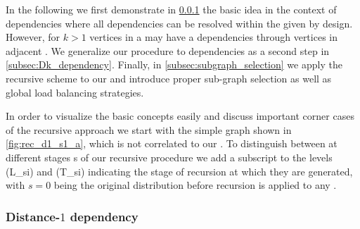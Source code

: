 In the following we first demonstrate in \cref{subsec:D1_dependency} the basic idea in the context of \DONE dependencies where all dependencies can be resolved within the given \levelGroup by design. However, for $k>1$ vertices in a \levelGroup may have a \DK dependencies through vertices in adjacent \levelGroups. We generalize our procedure to \DK dependencies as a second step in \cref{subsec:Dk_dependency}. Finally, in \cref{subsec:subgraph_selection} we apply the recursive scheme to our \stex and introduce proper sub-graph selection as well as global load balancing strategies. 

In order to visualize the basic concepts easily and discuss important corner cases of the recursive approach we start with the simple graph shown in \cref{fig:rec_d1_s1_a}, which is not correlated to our \stex. To distinguish between \levelGroups at different stages \acrshort{s} of our recursive procedure we add a subscript to the levels (\acrshort{L_si}) and \levelGroups (\acrshort{T_si}) indicating the stage of recursion at which they are generated, with $s=0$ being the original distribution before recursion is applied to any \subgraph. 

	
	\subsubsection{Distance-$1$ dependency} \label{subsec:D1_dependency}


